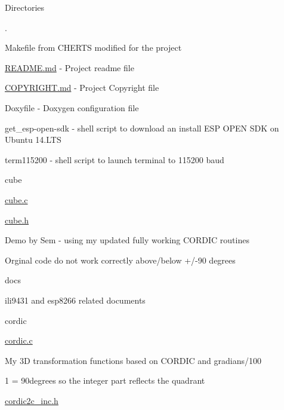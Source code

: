 \begin{DoxyParagraph}{Directories}

\begin{DoxyItemize}
\item .
\begin{DoxyItemize}
\item Makefile from C\-H\-E\-R\-T\-S modified for the project
\item \hyperlink{README_8md}{R\-E\-A\-D\-M\-E.\-md} -\/ Project readme file
\item \hyperlink{COPYRIGHT_8md}{C\-O\-P\-Y\-R\-I\-G\-H\-T.\-md} -\/ Project Copyright file
\item Doxyfile -\/ Doxygen configuration file
\item get\-\_\-esp-\/open-\/sdk -\/ shell script to download an install E\-S\-P O\-P\-E\-N S\-D\-K on Ubuntu 14.\-L\-T\-S
\item term115200 -\/ shell script to launch terminal to 115200 baud
\end{DoxyItemize}
\item cube
\begin{DoxyItemize}
\item \hyperlink{cube_8c}{cube.\-c}
\item \hyperlink{cube_8h}{cube.\-h}
\begin{DoxyItemize}
\item Demo by Sem -\/ using my updated fully working C\-O\-R\-D\-I\-C routines
\item Orginal code do not work correctly above/below +/-\/90 degrees
\end{DoxyItemize}
\end{DoxyItemize}
\item docs
\begin{DoxyItemize}
\item ili9431 and esp8266 related documents
\end{DoxyItemize}
\item cordic
\begin{DoxyItemize}
\item \hyperlink{cordic_8c}{cordic.\-c}
\begin{DoxyItemize}
\item My 3\-D transformation functions based on C\-O\-R\-D\-I\-C and gradians/100
\item 1 = 90degrees so the integer part reflects the quadrant
\end{DoxyItemize}
\item \hyperlink{cordic2c__inc_8h}{cordic2c\-\_\-inc.\-h}

\end{DoxyItemize}
\end{DoxyItemize}
\end{DoxyParagraph}
